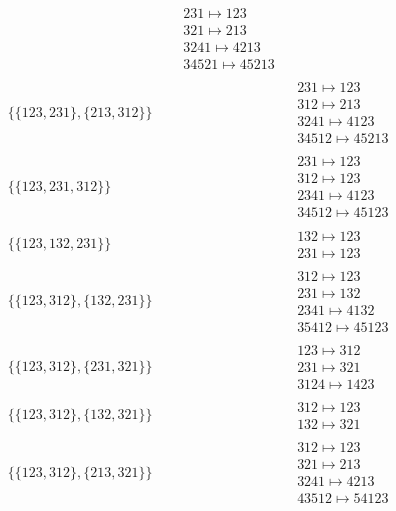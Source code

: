 \begin{tiny}
\begin{align}
&
\begin{matrix}
231 \mapsto 123\\321 \mapsto 213\\3241 \mapsto 4213\\34521 \mapsto 45213
\end{matrix}
\\
\{\{123, 231\}, \{213, 312\}\}
\quad
&
\phantom{.}
&
\begin{matrix}
231 \mapsto 123\\312 \mapsto 213\\3241 \mapsto 4123\\34512 \mapsto 45213
\end{matrix}
\\
\{\{123, 231, 312\}\}
\quad
&
\phantom{.}
&
\begin{matrix}
231 \mapsto 123\\312 \mapsto 123\\2341 \mapsto 4123\\34512 \mapsto 45123
\end{matrix}
\\
\{\{123, 132, 231\}\}
\quad
&
\phantom{.}
&
\begin{matrix}
132 \mapsto 123\\231 \mapsto 123
\end{matrix}
\\
\{\{123, 312\}, \{132, 231\}\}
\quad
&
\phantom{.}
&
\begin{matrix}
312 \mapsto 123\\231 \mapsto 132\\2341 \mapsto 4132\\35412 \mapsto 45123
\end{matrix}
\\
\{\{123, 312\}, \{231, 321\}\}
\quad
&
\phantom{.}
&
\begin{matrix}
123 \mapsto 312\\231 \mapsto 321\\3124 \mapsto 1423
\end{matrix}
\\
\{\{123, 312\}, \{132, 321\}\}
\quad
&
\phantom{.}
&
\begin{matrix}
312 \mapsto 123\\132 \mapsto 321
\end{matrix}
\\
\{\{123, 312\}, \{213, 321\}\}
\quad
&
\phantom{.}
&
\begin{matrix}
312 \mapsto 123\\321 \mapsto 213\\3241 \mapsto 4213\\43512 \mapsto 54123

\end{matrix}
\end{align}
\end{tiny}
